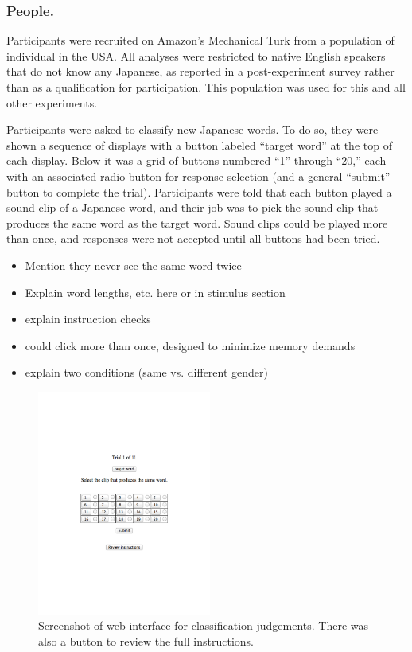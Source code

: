 \documentclass[10pt,letterpaper]{article}
\begin{document}
\subsubsection{People.}
Participants were recruited on Amazon's Mechanical Turk from a population of individual in the USA. All analyses were restricted to native English speakers that do not know any Japanese, as reported in a post-experiment survey rather than as a qualification for participation. This population was used for this and all other experiments. 

Participants were asked to classify new Japanese words. To do so, they were shown a sequence of displays with a button labeled ``target word'' at the top of each display. Below it was a grid of buttons numbered ``1'' through ``20,'' each with an associated radio button for response selection (and a general ``submit'' button to complete the trial). Participants were told that each button played a sound clip of a Japanese word, and their job was to pick the sound clip that produces the same word as the target word. Sound clips could be played more than once, and responses were not accepted until all buttons had been tried.

\begin{itemize}
\item Mention they never see the same word twice
\item Explain word lengths, etc. here or in stimulus section
\item explain instruction checks
\item could click more than once, designed to minimize memory demands
\item explain two conditions (same vs. different gender)
\end{itemize}

\begin{figure}[h]
\centering
\includegraphics[width=2.25in]{web_exp.pdf}
\caption{Screenshot of web interface for classification judgements. There was also a button to review the full instructions.}
\label{ss}
\end{figure}
\end{document}
